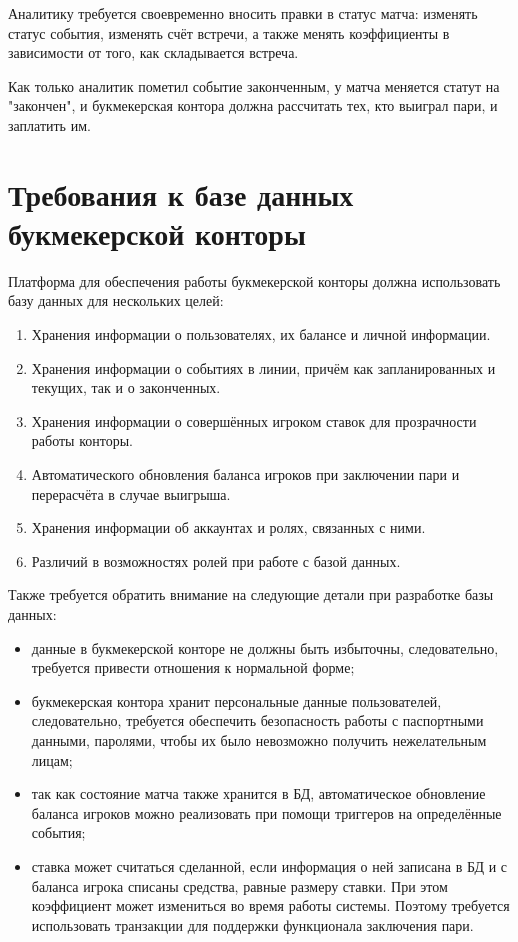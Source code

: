 Аналитику требуется своевременно вносить правки в статус матча: изменять статус события, изменять счёт встречи, а также менять коэффициенты в зависимости от того, как складывается встреча.

Как только аналитик пометил событие законченным, у матча меняется статут на "закончен", и букмекерская контора должна рассчитать тех, кто выиграл пари, и заплатить им.

\section{Требования к базе данных букмекерской конторы}
Платформа для обеспечения работы букмекерской конторы должна использовать базу данных для нескольких целей:
\begin{enumerate}
	\item Хранения информации о пользователях, их балансе и личной информации.
	\item Хранения информации о событиях в линии, причём как запланированных и текущих, так и о законченных.
	\item Хранения информации о совершённых игроком ставок для прозрачности работы конторы.
	\item Автоматического обновления баланса игроков при заключении пари и перерасчёта в случае выигрыша.
	\item Хранения информации об аккаунтах и ролях, связанных с ними.
	\item Различий в возможностях ролей при работе с базой данных.
\end{enumerate}

Также требуется обратить внимание на следующие детали при разработке базы данных:
\begin{itemize}
	\item данные в букмекерской конторе не должны быть избыточны, следовательно, требуется привести отношения к нормальной форме;
	\item букмекерская контора хранит персональные данные пользователей, следовательно, требуется обеспечить безопасность работы с паспортными данными, паролями, чтобы их было невозможно получить нежелательным лицам;
	\item так как состояние матча также хранится в БД, автоматическое обновление баланса игроков можно реализовать при помощи триггеров на определённые события;
	\item ставка может считаться сделанной, если информация о ней записана в БД и с баланса игрока списаны средства, равные размеру ставки. При этом коэффициент может измениться во время работы системы. Поэтому требуется использовать транзакции для поддержки функционала заключения пари.
\end{itemize}

